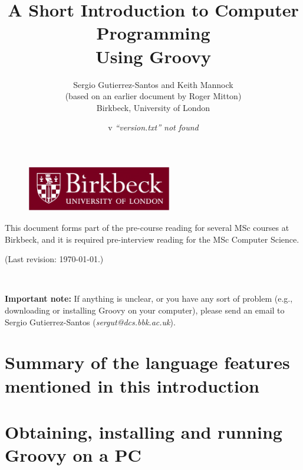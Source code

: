 \documentclass[11pt,a4paper]{article}
\title{A Short Introduction to Computer Programming\\
  Using Groovy}
\author{Sergio Gutierrez-Santos and Keith Mannock\\
  (based on an earlier document by Roger Mitton)\\
  Birkbeck, University of London}
\date{\InputIfFileExists{version.txt}
     {v}
     {\emph{``version.txt'' not found}}}
\begin{document}

\maketitle

\thispagestyle{empty}

\vfill 

\begin{figure}[h!]  %
  \centering
  \includegraphics[height=2cm]{bbk.eps}
\end{figure}

\vfill

\noindent This document forms part of the pre-course reading for
several MSc courses at Birkbeck, and it is required pre-interview
reading for the MSc Computer Science.


\noindent (Last revision: \today.)


\newpage

~\vspace{8cm}

\textbf{Important note: } If anything is unclear, or you have any 
sort of problem (e.g.,
downloading or installing Groovy on your computer), please send an
email to Sergio Gutierrez-Santos (\emph{sergut@dcs.bbk.ac.uk}).
\newpage


\newpage


\newpage


\newpage


\newpage


\newpage

\section{Summary of the language features mentioned in this introduction}

\newpage

\section{Obtaining, installing and running Groovy on a PC}
\label{sec:obta-inst-runn}

\end{document}
